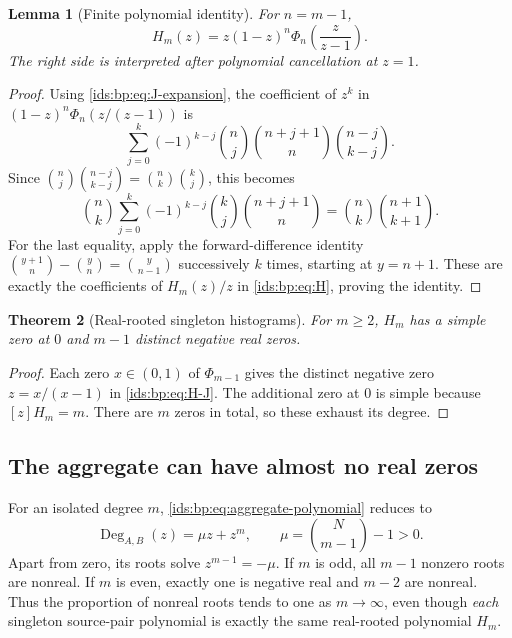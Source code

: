 \documentclass[11pt,letterpaper]{article}
\newtheorem{theorem}{Theorem}[section]
\newtheorem{lemma}[theorem]{Lemma}
\theoremstyle{definition}\newtheorem{definition}[theorem]{Definition}
\theoremstyle{remark}\newtheorem{remark}[theorem]{Remark}
\theoremstyle{definition}\newtheorem{question}[theorem]{Question}
\begin{document}
\begin{lemma}[Finite polynomial identity]
\label{ids:bp:lem:mobius}
For $n=m-1$,
\begin{equation}
 H_m(z)=z(1-z)^n \Phi_n\!\left(\frac{z}{z-1}\right).
 \label{ids:bp:eq:H-J}
\end{equation}
The right side is interpreted after polynomial cancellation at $z=1$.
\end{lemma}
\begin{proof}
Using \eqref{ids:bp:eq:J-expansion}, the coefficient of $z^k$ in
$(1-z)^n\Phi_n(z/(z-1))$ is
\[
 \sum_{j=0}^k(-1)^{k-j}\binom nj\binom{n+j+1}{n}\binom{n-j}{k-j}.
\]
Since $\binom nj\binom{n-j}{k-j}=\binom nk\binom kj$, this becomes
\[
 \binom nk\sum_{j=0}^k(-1)^{k-j}\binom kj\binom{n+j+1}{n}
 =\binom nk\binom{n+1}{k+1}.
\]
For the last equality, apply the forward-difference identity
$\binom{y+1}{n}-\binom yn=\binom y{n-1}$ successively $k$ times, starting
at $y=n+1$. These are exactly the coefficients of $H_m(z)/z$ in
\eqref{ids:bp:eq:H}, proving the identity.
\end{proof}

\begin{theorem}[Real-rooted singleton histograms]
\label{ids:bp:thm:realroots}
For $m\geq2$, $H_m$ has a simple zero at $0$ and $m-1$ distinct negative
real zeros.
\end{theorem}
\begin{proof}
Each zero $x\in(0,1)$ of $\Phi_{m-1}$ gives the distinct negative zero
$z=x/(x-1)$ in \eqref{ids:bp:eq:H-J}. The additional zero at $0$ is simple
because $[z]H_m=m$. There are $m$ zeros in total, so these exhaust its
degree.
\end{proof}

\subsection{The aggregate can have almost no real zeros}
For an isolated degree $m$, \eqref{ids:bp:eq:aggregate-polynomial} reduces to
\begin{equation}
 \operatorname{Deg}_{A,B}(z)=\mu z+z^m,\qquad \mu=\binom{N}{m-1}-1>0.
 \label{ids:bp:eq:two-term}
\end{equation}
Apart from zero, its roots solve $z^{m-1}=-\mu$. If $m$ is odd, all $m-1$
nonzero roots are nonreal. If $m$ is even, exactly one is negative real and
$m-2$ are nonreal. Thus the proportion of nonreal roots tends to one as
$m\to\infty$, even though \emph{each} singleton source-pair polynomial is
exactly the same real-rooted polynomial $H_m$.
\end{document}
